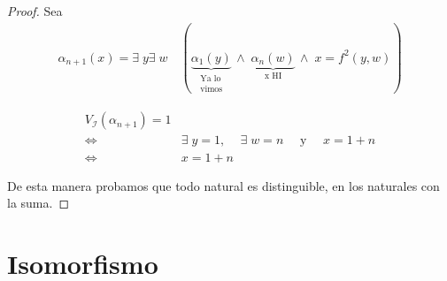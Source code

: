 \begin{itemize}
        \begin{proof} \phantom{.}

            Sea
            \begin{gather*}
                \alpha_{n+1}(x) = \exists\; y \exists \; w
                \quad (
                \underbrace{\alpha_1(y)}_{\substack{\text{Ya lo}\\
                    \text{vimos}}} \,
                \wedge \;
                \underbrace{\alpha_n(w)}_{\text{x HI}} \,
                \wedge \;
                x = f^2(y,w))
            \end{gather*}

            \begin{align*}
                V_{\mathcal{I}}(\alpha_{n+1}) = 1 \\
                \iff & \exists\; y = 1 \text{, } 
                \quad \exists \; w = n 
                \quad \text{ y } 
                \quad x = 1 + n \\
                \iff & x = 1 + n
            \end{align*}

            De esta manera probamos que todo natural es distinguible,
            en los naturales con la suma.

        \end{proof}
\end{itemize}

\section{Isomorfismo}

